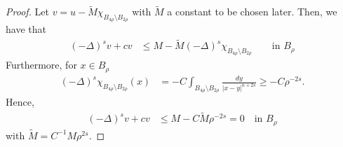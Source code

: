 \documentclass[a4paper,12pt,reqno]{amsart}
\numberwithin{equation}{section}
\theoremstyle{definition}
\theoremstyle{notation}
\begin{document}
\begin{proof}
   
  Let \(v=u- \tilde M \chi_{B_{4\rho}\setminus B_{2\rho}}\) with \(\tilde M\) a constant to be chosen later. Then, we have that \begin{align*}
        (-\Delta)^sv+cv&\leq M-\tilde M (-\Delta)^s\chi_{B_{4\rho}\setminus B_{2\rho}} \qquad \text{in }B_\rho  
    \end{align*} Furthermore, for \(x\in B_\rho\) \begin{align*}
        (-\Delta)^s \chi_{B_{4\rho}\setminus B_{2\rho}}(x) &= -C\int_{B_{4\rho}\setminus B_{2\rho}} \frac{d y }{\vert x - y \vert^{n+2s}} \geq  - C \rho^{-2s}. 
    \end{align*} Hence, \begin{align*}
          (-\Delta)^sv+cv&\leq M-C \tilde M\rho^{-2s} = 0 \quad \text{in }B_\rho
    \end{align*} with \(\tilde M = C^{-1} M\rho^{2s}\).



\end{proof}
\end{document}
